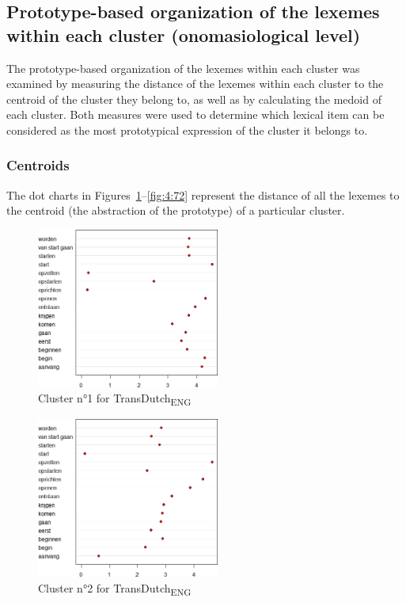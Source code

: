 \subsection{Prototype-based organization of the lexemes within each cluster (onomasiological level)}
\label{sec:4.3.3}  
The prototype-based organization of the lexemes within each cluster was examined by measuring the distance of the lexemes within each cluster to the centroid of the cluster they belong to, as well as by calculating the medoid of each cluster. Both measures were used to determine which lexical item can be considered as the most prototypical expression of the cluster it belongs to.

\subsubsection{Centroids}
\label{sec:4.3.3.1}  
The dot charts in Figures~\ref{fig:4:67}--\ref{fig:4:72} represent the distance of all the lexemes to the centroid (the abstraction of the prototype) of a particular cluster.

\begin{figure}
\includegraphics[width=6cm]{figures/Vandevoorde2-img69.png}
\caption{\label{fig:4:67}Cluster n°1 for TransDutch\textsubscript{ENG}}
\end{figure}

\begin{figure}
\includegraphics[width=6cm]{figures/Vandevoorde2-img70.png}
\caption{\label{fig:4:68}Cluster n°2 for TransDutch\textsubscript{ENG}}
\end{figure}

